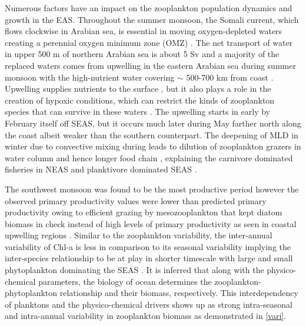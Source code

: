 \documentclass{article}
\begin{document}
	Numerous factors have an impact on the zooplankton population dynamics and growth in the EAS. Throughout the summer monsoon, the Somali current, which flows clockwise in Arabian sea, is essential in moving oxygen-depleted waters creating a perennial oxygen minimum zone (OMZ) \citep{sarma2020potential,sudheesh2022omz}. The net transport of water in upper 500 m of northern Arabian sea is about 5 Sv and a majority of the replaced waters comes from upwelling in the eastern Arabian sea \citep{shi1999remotely} during summer monsoon with the high-nutrient water covering $\sim$ 500-700 km from coast \citep{morrison1998seasonal}. Upwelling supplies nutrients to the surface \citep{Kumar.2000}, but it also plays a role in the creation of hypoxic conditions, which can restrict the kinds of zooplankton species that can survive in these waters \citep{jayakumar.2004}. The upwelling starts in early by February itself off SEAS, but it occurs much later during May farther north along the coast \citep{banse1968hydrography,Kumar.2000,vijith2016consequences,sarma2020potential} albeit weaker than the southern counterpart. The deepening of MLD in winter due to convective mixing during \citep{marra2005jgofs, shankar2016inhibition,shi2022phytoplankton} leads to dilution of zooplankton grazers in water column \citep{marra2005jgofs} and hence longer food chain \citep{banse1995zooplankton,barber2001qn}, explaining the carnivore dominated fisheries in NEAS \citep{shankar2019role} and planktivore dominated SEAS \citep{longhurst1990gd,shankar2019role}. 
	
	The southwest monsoon was found to be the most productive period \citep{Kumar.2000} however the observed primary productivity values were lower than predicted primary productivity owing to efficient grazing by mesozooplankton that kept diatom biomass in check instead of high levels of primary productivity as seen in coastal upwelling regions \citep{barber2001qn}. Similar to the zooplankton variability, the inter-annual variability of Chl-a is less in comparison to its seasonal variability \citep{shi2022phytoplankton} implying the inter-species relationship to be at play in shorter timescale with large and small phytoplankton dominating the SEAS \citep{shankar2019role}. It is inferred that along with the physico-chemical parameters, the biology of ocean determines the zooplankton-phytoplankton relationship and their biomass, respectively. This interdependency of planktons and the physico-chemical drivers shows up as strong intra-seasonal and intra-annual variability in zooplankton biomass as demonstrated in \autoref{vari}. 
	
\end{document}
